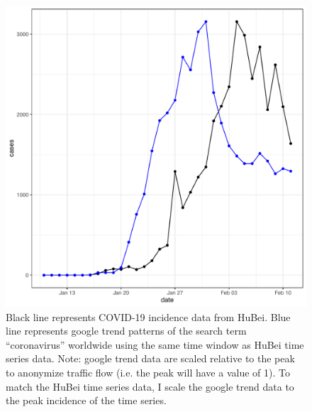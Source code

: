 \begin{center}
\begin{figure}[ht!]
\includegraphics[scale = 0.5]{./figures/gtplot.Rout.pdf}
\caption{Black line represents COVID-19 incidence data from HuBei. Blue line represents google trend patterns of the search term ``coronavirus'' worldwide using the same time window as HuBei time series data. Note: google trend data are scaled relative to the peak to anonymize traffic flow (i.e. the peak will have a value of 1). To match the HuBei time series data, I scale the google trend data to the peak incidence of the time series.}
\end{figure}
\end{center}


